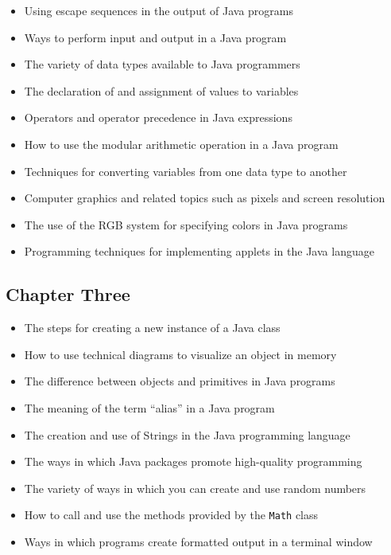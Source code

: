 \begin{itemize}

  \itemsep -.015in
  \item Using escape sequences in the output of Java programs
  \item Ways to perform input and output in a Java program
  \item The variety of data types available to Java programmers
  \item The declaration of and assignment of values to variables
  \item Operators and operator precedence in Java expressions
  \item How to use the modular arithmetic operation in a Java program
  \item Techniques for converting variables from one data type to another
  \item Computer graphics and related topics such as pixels and screen resolution
  \item The use of the RGB system for specifying colors in Java programs
  \item Programming techniques for implementing applets in the Java language

\end{itemize}

\vspace*{-.25in}
\subsection*{Chapter Three}
\vspace*{-.1in}

\begin{itemize}

  \itemsep -.015in
  \item The steps for creating a new instance of a Java class
  \item How to use technical diagrams to visualize an object in memory
  \item The difference between objects and primitives in Java programs
  \item The meaning of the term ``alias'' in a Java program
  \item The creation and use of Strings in the Java programming language
  \item The ways in which Java packages promote high-quality programming
  \item The variety of ways in which you can create and use random numbers
  \item How to call and use the methods provided by the {\tt Math} class
  \item Ways in which programs create formatted output in a terminal window

\end{itemize}

